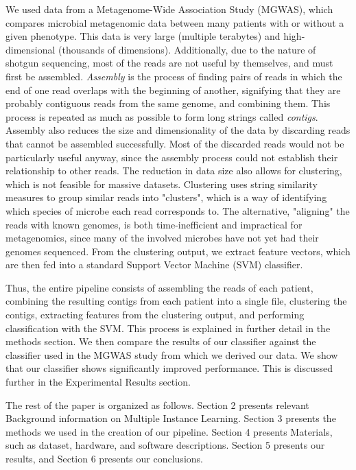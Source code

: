 We used data from a Metagenome-Wide Association Study (MGWAS), which compares microbial metagenomic data between many patients with or without a given phenotype. This data is very large (multiple terabytes) and high-dimensional (thousands of dimensions). Additionally, due to the nature of shotgun sequencing, most of the reads are not useful by themselves, and must first be assembled. \emph{Assembly} is the process of finding pairs of reads in which the end of one read overlaps with the beginning of another, signifying that they are probably contiguous reads from the same genome, and combining them. This process is repeated as much as possible to form long strings called \emph{contigs}. Assembly also reduces the size and dimensionality of the data by discarding reads that cannot be assembled successfully. Most of the discarded reads would not be particularly useful anyway, since the assembly process could not establish their relationship to other reads. The reduction in data size also allows for clustering, which is not feasible for massive datasets. Clustering uses string similarity measures to group similar reads into "clusters", which is a way of identifying which species of microbe each read corresponds to. The alternative, "aligning" the reads with known genomes, is both time-inefficient and impractical for metagenomics, since many of the involved microbes have not yet had their genomes sequenced. From the clustering output, we extract feature vectors, which are then fed into a standard Support Vector Machine (SVM) classifier. 

Thus, the entire pipeline consists of assembling the reads of each patient, combining the resulting contigs from each patient into a single file, clustering the contigs, extracting features from the clustering output, and performing classification with the SVM. This process is explained in further detail in the methods section. We then compare the results of our classifier against the classifier used in the MGWAS study from which we derived our data. We show that our classifier shows significantly improved performance. This is discussed further in the Experimental Results section.

The rest of the paper is organized as follows. Section 2 presents relevant Background information on  Multiple Instance Learning. Section 3 presents the methods we used in the creation of our pipeline. Section 4 presents Materials, such as dataset, hardware, and software descriptions. Section 5 presents our results, and Section 6 presents our conclusions.